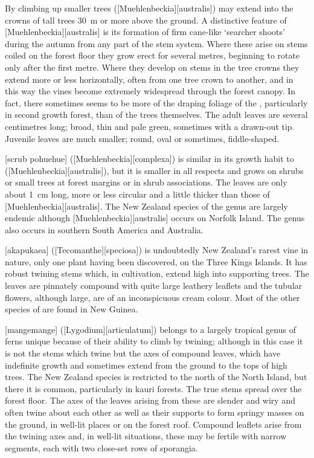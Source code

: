 By climbing up smaller trees  ([Muehlenbeckia][australis]) may extend into the crowns of tall trees \SI{30}{\metre} or more above the ground.
A distinctive feature of [Muehlenbeckia][australis] is its formation of firm cane-like `searcher shoots' during the autumn from any part of the stem system.
Where these arise on stems coiled on the forest floor they grow erect for several metres, beginning to rotate only after the first metre.
Where they develop on stems in the tree crowns they extend more or less horizontally, often from one tree crown to another, and in this way the vines become extremely widespread through the forest canopy.
In fact, there sometimes seems to be more of the draping foliage of the , particularly in second growth forest, than of the trees themselves.
The adult leaves are several centimetres long; broad, thin and pale green, sometimes with a drawn-out tip.
Juvenile leaves are much smaller; round, oval or sometimes, fiddle-shaped.

[scrub pohuehue] ([Muehlenbeckia][complexa]) is similar in its growth habit to  ([Muehlenbeckia][australis]), but it is smaller in all respects and grows on shrubs or small trees at forest margins or in shrub associations.
The leaves are only about \SI{1}{\centi\metre} long, more or less circular and a little thicker than those of [Muehlenbeckia][australis].
The New Zealand species of the genus are largely endemic although [Muehlenbeckia][australis] occurs on Norfolk Island.
The genus also occurs in southern South America and Australia.

[akapukaea] ([Tecomanthe][speciosa]) is undoubtedly New Zealand's rarest vine in nature, only one plant having been discovered, on the Three Kings Islands.
It has robust twining stems which, in cultivation, extend high into supporting trees.
The leaves are pinnately compound with quite large leathery leaflets and the tubular flowers, although large, are of an inconspicuous cream colour.
Most of the other species of  are found in New Guinea.

[mangemange] ([Lygodium][articulatum]) belongs to a largely tropical genus of ferns unique because of their ability to climb by twining; although in this case it is not the stems which twine but the axes of compound leaves, which have indefinite growth and sometimes extend from the ground to the tops of high trees.
The New Zealand species is restricted to the north of the North Island, but there it is common, particularly in kauri forests.
The true stems spread over the forest floor.
The axes of the leaves arising from these are slender and wiry and often twine about each other as well as their supports to form springy masses on the ground, in well-lit places or on the forest roof.
Compound leaflets arise from the twining axes and, in well-lit situations, these may be fertile with narrow segments, each with two close-set rows of sporangia.

